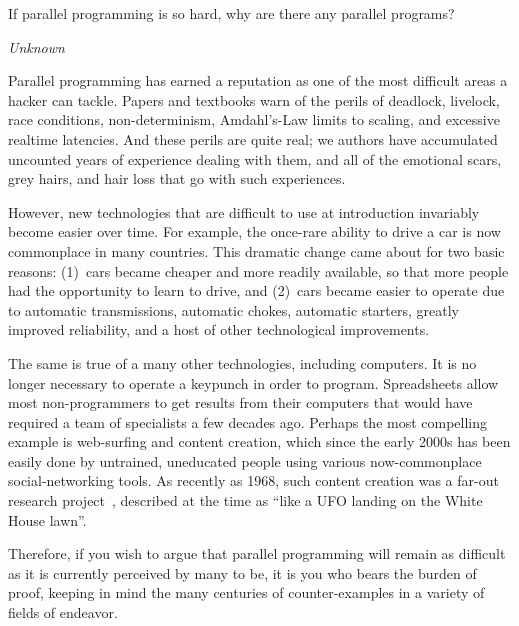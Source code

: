 

\epigraph{If parallel programming is so hard, why are there any
	  parallel programs?}{\emph{Unknown}}

Parallel programming has earned a reputation as one of the most
difficult areas a hacker can tackle.
Papers and textbooks warn of the perils of deadlock, livelock,
race conditions, non-determinism, Amdahl's-Law limits to scaling,
and excessive realtime latencies.
And these perils are quite real; we authors have accumulated uncounted
years of experience dealing with them, and all of the emotional scars,
grey hairs, and hair loss that go with such experiences.

However, new technologies that are difficult to use at introduction
invariably become easier over time.
For example, the once-rare ability to drive a car is now
commonplace in many countries.
This dramatic change came about for two basic reasons: (1)~cars became
cheaper and more readily available, so that more people had the
opportunity to learn to drive, and (2)~cars became easier to operate
due to automatic transmissions, automatic chokes, automatic starters,
greatly improved reliability,
and a host of other technological improvements.

The same is true of a many other technologies, including computers.
It is no longer necessary to operate a keypunch in order to program.
Spreadsheets allow most non-programmers to get results from their computers
that would have required a team of specialists a few decades ago.
Perhaps the most compelling example is web-surfing and content creation,
which since the early 2000s has been easily done by
untrained, uneducated people using various now-commonplace
social-networking tools.
As recently as 1968, such content creation was a far-out research
project~\cite{DouglasEngelbart1968}, described at
the time as
``like a UFO landing on the White House lawn''\cite{ScottGriffen2000}.

Therefore, if you wish to argue that parallel programming will remain
as difficult as it is currently perceived by many to be, it is you
who bears the burden of proof, keeping in mind the many centuries of
counter-examples in a variety of fields of endeavor.

